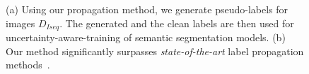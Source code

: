 \begin{figure}[t]
{\begin{minipage}{0.33\textwidth}
				\vspace{0.3em}
			\end{minipage}
		}
    \vspace{-0.5em}
		\caption{\small (a) Using our propagation method, we generate pseudo-labels for images $D_{Iseq}$. The generated and the clean labels are then used for uncertainty-aware-training of semantic segmentation models. (b) Our method significantly surpasses \textit{state-of-the-art} label propagation methods~\cite{nvidia_cvpr19}.
		}
		\vspace{-0.5em}
	\end{figure}
